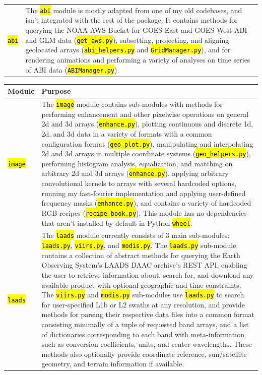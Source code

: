 \documentclass[12pt]{article}
\newcommand{\hltexttt}[1]{\texttt{\hl{#1}}}
\begin{document}
\begin{table}[h!]
\begin{tabular}{ l p{14cm} }
        \hltexttt{abi} &
        The \hltexttt{abi} module is mostly adapted from one of my old codebases, and isn't integrated with the rest of the package. It contains methods for querying the NOAA AWS Bucket for GOES East and GOES West ABI and GLM data (\hltexttt{get\_aws.py}), subsetting, projecting, and aligning geolocated arrays (\hltexttt{abi\_helpers.py} and \hltexttt{GridManager.py}), and for rendering animations and performing a variety of analyses on time series of ABI data (\hltexttt{ABIManager.py}).
         \\
    \end{tabular}
\end{table}

\begin{table}[h]
    \begin{tabular}{ l p{14cm}}

        \textbf{Module} & \textbf{Purpose} \\\hline

        \hltexttt{image} &
        The \hltexttt{image} module contains sub-modules with methods for performing enhancement and other pixelwise operations on general 2d and 3d arrays (\hltexttt{enhance.py}), plotting continuous and discrete 1d, 2d, and 3d data in a variety of formats with a common configuration format (\hltexttt{geo\_plot.py}), manipulating and interpolating 2d and 3d arrays in multiple coordinate systems (\hltexttt{geo\_helpers.py}), performing histogram analysis, equalization, and matching on arbitrary 2d and 3d arrays (\hltexttt{enhance.py}), applying arbitrary convolutional kernels to arrays with several hardcoded options, running my fast-fourier implementation and applying user-defined frequency masks (\hltexttt{enhance.py}), and contains a variety of hardcoded RGB recipes (\hltexttt{recipe\_book.py}). This module has no dependencies that aren't installed by default in Python \hltexttt{wheel}.
        \\\hline

        \hltexttt{laads} &
        The \hltexttt{laads} module currently consists of 3 main sub-modules: \hltexttt{laads.py}, \hltexttt{viirs.py}, and \hltexttt{modis.py}. The \hltexttt{laads.py} sub-module contains a collection of abstract methods for querying the Earth Observing System's LAADS DAAC archive's REST API, enabling the user to retrieve information about, search for, and download any available product with optional geographic and time constraints. The \hltexttt{viirs.py} and \hltexttt{modis.py} sub-modules use \hltexttt{laads.py} to search for user-specified L1b or L2 swaths at any resolution, and provide methods for parsing their respective data files into a common format consisting minimally of a tuple of requested band arrays, and a list of dictionaries corresponding to each band with meta-information such as conversion coefficients, units, and center wavelengths. These methods also optionally provide coordinate reference, sun/satellite geometry, and terrain information if available.
        \\\hline


\end{tabular}
\end{table}
\end{document}
